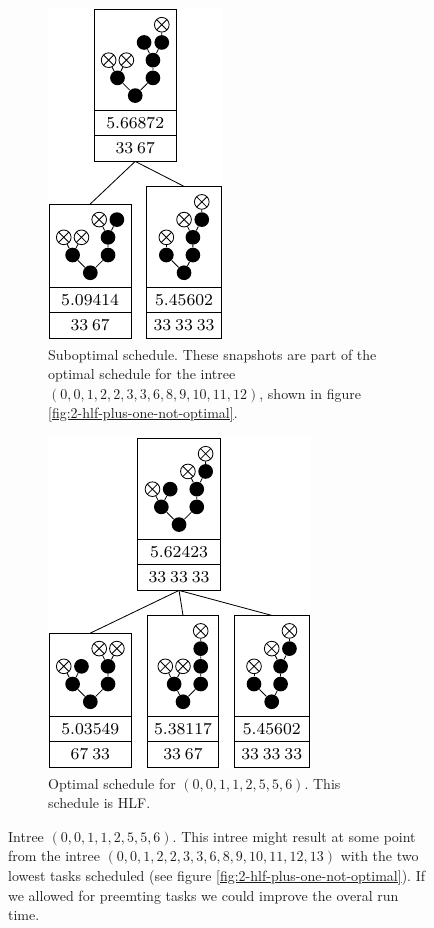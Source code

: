 \begin{figure}[ht]
  \centering
  \begin{subfigure}{.46\textwidth}
    \centering
    \includegraphics{p3/preemtive/00112556subopt.pdf}
    \caption{Suboptimal schedule. These snapshots are part of the optimal schedule for the intree $(0,0,1,2,2,3,3,6,8,9,10,11,12)$, shown in figure \ref{fig:2-hlf-plus-one-not-optimal}.}
    \label{fig:preemtive-better-bad-case}
  \end{subfigure}
  \quad
  \begin{subfigure}{.46\textwidth}
    \centering
    \includegraphics{p3/preemtive/00112556opt.pdf}
    \caption{Optimal schedule for $(0,0,1,1,2,5,5,6)$. This schedule is HLF.}
    \label{fig:preemtive-better-good-case}
  \end{subfigure}
  \caption{Intree $(0,0,1,1,2,5,5,6)$. This intree might result at some point from the intree $(0,0,1,2,2,3,3,6,8,9,10,11,12,13)$ with the two lowest tasks scheduled (see figure \ref{fig:2-hlf-plus-one-not-optimal}). If we allowed for preemting tasks we could improve the overal run time.}
  \label{fig:preemtive-is-better}
\end{figure}

